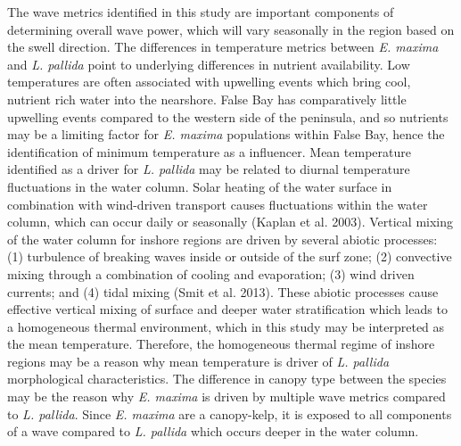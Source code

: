 \documentclass[
  a4paper,
]{article}
\begin{document}
The wave metrics identified in this study are important components of
determining overall wave power, which will vary seasonally in the region
based on the swell direction. The differences in temperature metrics
between \emph{E. maxima} and \emph{L. pallida} point to underlying
differences in nutrient availability. Low temperatures are often
associated with upwelling events which bring cool, nutrient rich water
into the nearshore. False Bay has comparatively little upwelling events
compared to the western side of the peninsula, and so nutrients may be a
limiting factor for \emph{E. maxima} populations within False Bay, hence
the identification of minimum temperature as a influencer. Mean
temperature identified as a driver for \emph{L. pallida} may be related
to diurnal temperature fluctuations in the water column. Solar heating
of the water surface in combination with wind-driven transport causes
fluctuations within the water column, which can occur daily or
seasonally (Kaplan et al. 2003). Vertical mixing of the water column for
inshore regions are driven by several abiotic processes: (1) turbulence
of breaking waves inside or outside of the surf zone; (2) convective
mixing through a combination of cooling and evaporation; (3) wind driven
currents; and (4) tidal mixing (Smit et al. 2013). These abiotic
processes cause effective vertical mixing of surface and deeper water
stratification which leads to a homogeneous thermal environment, which
in this study may be interpreted as the mean temperature. Therefore, the
homogeneous thermal regime of inshore regions may be a reason why mean
temperature is driver of \emph{L. pallida} morphological
characteristics. The difference in canopy type between the species may
be the reason why \emph{E. maxima} is driven by multiple wave metrics
compared to \emph{L. pallida}. Since \emph{E. maxima} are a canopy-kelp,
it is exposed to all components of a wave compared to \emph{L. pallida}
which occurs deeper in the water column.
\end{document}
